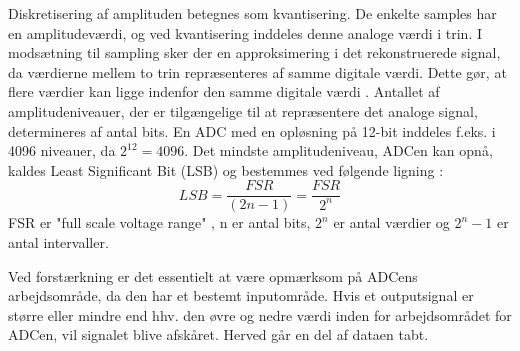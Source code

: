 Diskretisering af amplituden betegnes som kvantisering. De enkelte samples har en amplitudeværdi, og ved kvantisering inddeles denne analoge værdi i trin. I modsætning til sampling sker der en approksimering i det rekonstruerede signal, da værdierne mellem to trin repræsenteres af samme digitale værdi. Dette gør, at flere værdier kan ligge indenfor den samme digitale værdi \cite{Zouridakis2003}. Antallet af amplitudeniveauer, der er tilgængelige til at repræsentere det analoge signal, determineres af antal bits. En ADC med en opløsning på 12-bit inddeles f.eks. i 4096 niveauer, da $2^{12}=4096$. \cite{Konrad2006} Det mindste amplitudeniveau, ADCen kan opnå, kaldes Least Significant Bit (LSB) og bestemmes ved følgende ligning : \\
\begin{equation}\label{ligningLSB}
	LSB = \frac{FSR}{(2n-1)} = \frac{FSR}{2^{n}}
\end{equation}
FSR er "full scale voltage range" , n er antal bits, $2^n$ er antal værdier og $2^{n}-1$ er antal intervaller. 

Ved forstærkning er det essentielt at være opmærksom på ADCens  arbejdsområde, da den har et bestemt inputområde. Hvis et outputsignal er større eller mindre end hhv. den øvre og nedre værdi inden for arbejdsområdet for ADCen, vil signalet blive afskåret. Herved går en del af dataen tabt.  